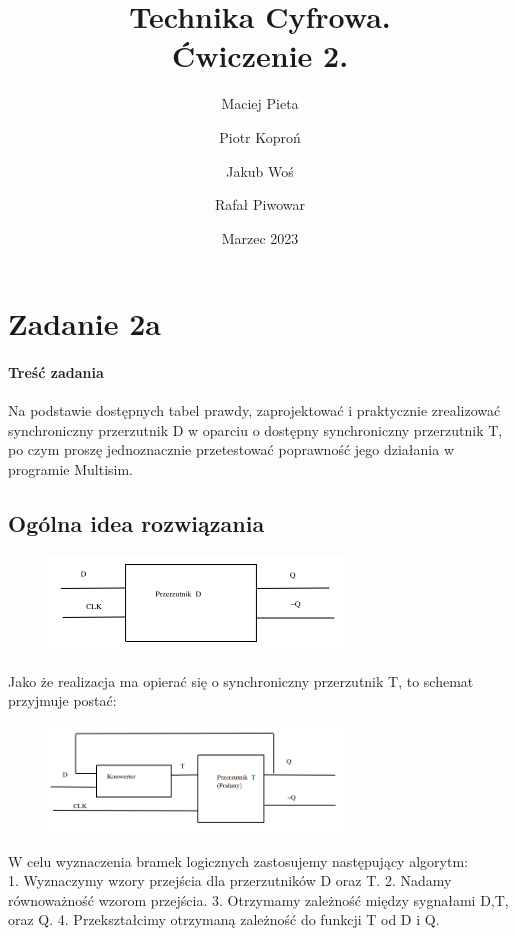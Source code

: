 \documentclass{article}
\author{Maciej Pieta \and Piotr Koproń \and Jakub Woś \and Rafał Piwowar}
\date{Marzec 2023}
\title{Technika Cyfrowa. \\ Ćwiczenie 2.}
\begin{document}
\maketitle
\newpage

\section{Zadanie 2a}
\paragraph{Treść zadania} Na podstawie dostępnych tabel prawdy, zaprojektować i praktycznie zrealizować synchroniczny przerzutnik D w oparciu o dostępny synchroniczny przerzutnik T, po czym proszę jednoznacznie przetestować poprawność jego działania w programie Multisim. 
\subsection{Ogólna idea rozwiązania}
\begin{figure}[H]
\includegraphics[width=0.7\textwidth]{DBB}
\end{figure}
Jako że realizacja ma opierać się o synchroniczny przerzutnik T, to schemat przyjmuje postać:
\begin{figure}[H]
\includegraphics[width=0.7\textwidth]{KBB}
\end{figure}
W celu wyznaczenia bramek logicznych zastosujemy następujący algorytm: \\
1. Wyznaczymy wzory przejścia dla przerzutników D oraz T.
2. Nadamy równoważność wzorom przejścia.
3. Otrzymamy zależność między sygnałami D,T, oraz Q.
4. Przekształcimy otrzymaną zależność do funkcji T od D i Q.
\newpage
\end{document}
